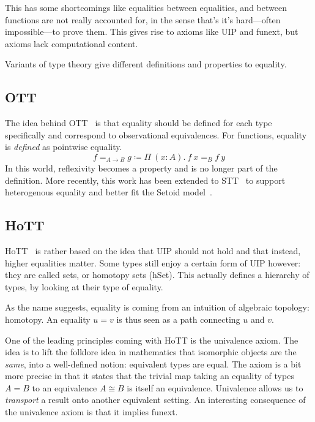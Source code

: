 This has some shortcomings like equalities between equalities, and between
functions are not really accounted for, in the sense that's it's hard---often
impossible---to prove them.
This gives rise to axioms like \acrshort{UIP} and \acrshort{funext}, but axioms
lack computational content.

Variants of type theory give different definitions and properties to equality.

\subsection{\acrfull{OTT}}

The idea behind \acrshort{OTT}~ is that
equality should be defined for each type specifically and correspond to
observational equivalences. For functions, equality is \emph{defined} as
pointwise equality.
\[
  f =_{A \to B} g \coloneqq \Pi\ (x : A).\ f\ x =_B f\ y
\]
In this world, reflexivity becomes a property and is no longer part of the
definition.
More recently, this work has been extended to
\acrfull{STT}~ to support heterogenous equality
and better fit the Setoid model~.

\subsection{\acrfull{HoTT}}

\acrshort{HoTT}~ is rather based on the idea that
\acrshort{UIP} should not hold and that instead, higher equalities matter.
Some types still enjoy a certain form of \acrshort{UIP} however: they are called
sets, or homotopy sets (hSet). This actually defines a hierarchy of types, by
looking at their type of equality.

As the name suggests, equality is coming from an intuition of algebraic
topology: homotopy. An equality \(u = v\) is thus seen as a path connecting
\(u\) and \(v\).

 One of the leading principles coming with \acrshort{HoTT}
is the univalence axiom. The idea is to lift the folklore idea in mathematics
that isomorphic objects are the \emph{same}, into a well-defined notion:
equivalent types are equal.
The axiom is a bit more precise in that it states that the trivial map
taking an equality of types \(A = B\) to an equivalence \(A \cong B\)
is itself an equivalence.
Univalence allows us to \emph{transport} a result onto another equivalent
setting.
An interesting consequence of the univalence axiom is that it implies
\acrshort{funext}.

